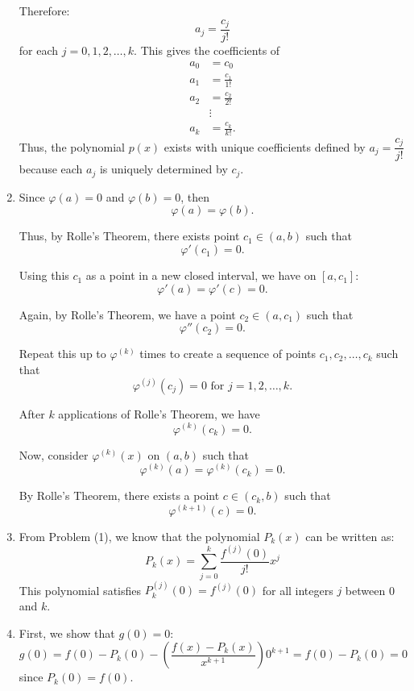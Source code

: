 \documentclass[12pt]{article}
\begin{document}
\begin{enumerate}
          Therefore:
          \[
              a_j = \frac{c_j}{j!}
          \]
          for each \(j = 0,1,2,\dots,k\). This gives the coefficients of
          \begin{align*}
              a_{0} & = c_{0}             \\
              a_{1} & = \frac{c_{1}}{1!}  \\
              a_{2} & = \frac{c_{2}}{2!}  \\
                    & \vdots              \\
              a_{k} & = \frac{c_{k}}{k!}.
          \end{align*}
          Thus, the polynomial \(p(x)\) exists with unique coefficients defined by \(a_{j} = \dfrac{c_{j}}{j!}\) because each \(a_{j}\) is uniquely determined by \(c_{j}\).
    \item
          Since \(\varphi(a) = 0\) and \(\varphi(b) = 0\), then
          \[
              \varphi(a) = \varphi(b).
          \]

          Thus, by Rolle's Theorem, there exists point \(c_{1} \in (a,b)\) such that
          \[
              \varphi'(c_{1}) = 0.
          \]

          Using this \(c_{1}\) as a point in a new closed interval, we have on \([a,c_{1}]\):
          \[
              \varphi'(a) = \varphi'(c) = 0.
          \]

          Again, by Rolle's Theorem, we have a point \(c_{2} \in (a,c_{1})\) such that
          \[
              \varphi''(c_{2}) = 0.
          \]

          Repeat this up to \(\varphi^{(k)}\) times to create a sequence of points \(c_{1},c_{2},\dots,c_{k}\) such that
          \[
              \varphi^{(j)}(c_{j}) = 0 \text{ for } j = 1,2,\dots,k.
          \]

          After \(k\) applications of Rolle's Theorem, we have
          \[
              \varphi^{(k)}(c_{k}) = 0.
          \]

          Now, consider \(\varphi^{(k)}(x)\) on \((a,b)\) such that
          \[
              \varphi^{(k)}(a) = \varphi^{(k)}(c_{k}) = 0.
          \]

          By Rolle's Theorem, there exists a point \(c \in (c_{k},b)\) such that
          \[
              \varphi^{(k + 1)}(c) = 0.
          \]
    \item
          From Problem (1), we know that the polynomial \(P_{k}(x)\) can be written as:
          \[
              P_{k}(x) = \sum_{j=0}^{k} \frac{f^{(j)}(0)}{j!} x^j
          \]
          This polynomial satisfies \(P_{k}^{(j)}(0) = f^{(j)}(0)\) for all integers \(j\) between 0 and \(k\).
    \item
          First, we show that \(g(0) = 0\):
          \[
              g(0) = f(0) - P_{k}(0) - \left(\frac{f(x) - P_{k}(x)}{x^{k + 1}}\right)0^{k + 1} = f(0) - P_{k}(0) = 0
          \]
          since \(P_{k}(0) = f(0)\).


\end{enumerate}
\end{document}
